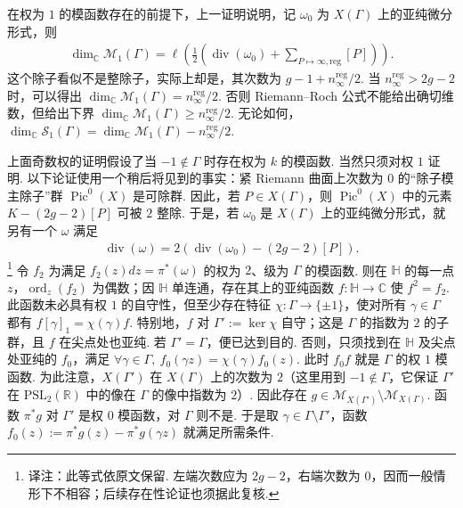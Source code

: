 \begin{remark*}[{$k=1$ 时会怎样？}]
在权为 $1$ 的模函数存在的前提下，上一证明说明，记 $\omega_0$ 为 $X(\Gamma)$ 上的亚纯微分形式，则
\begin{align*}
\dim_{\mathbb C}\mathcal M_1(\Gamma)=\ell\left(\tfrac12\left(\operatorname{div}(\omega_0)+\sum_{P\mapsto\infty,\mathrm{reg}}[P]\right)\right).
\end{align*}
这个除子看似不是整除子，实际上却是，其次数为 $g-1+n_\infty^{\mathrm{reg}}/2$. 当 $n_\infty^{\mathrm{reg}}>2g-2$ 时，可以得出 $\dim_{\mathbb C}\mathcal M_1(\Gamma)=n_\infty^{\mathrm{reg}}/2$. 否则 Riemann--Roch 公式不能给出确切维数，但给出下界 $\dim_{\mathbb C}\mathcal M_1(\Gamma)\geqslant n_\infty^{\mathrm{reg}}/2$. 无论如何，$\dim_{\mathbb C}\mathcal S_1(\Gamma)=\dim_{\mathbb C}\mathcal M_1(\Gamma)-n_\infty^{\mathrm{reg}}/2$.
\end{remark*}
\begin{remark*}[{权为 $1$ 的模函数的存在性}]
上面奇数权的证明假设了当 $-1\notin\Gamma$ 时存在权为 $k$ 的模函数. 当然只须对权 $1$ 证明. 以下论证使用一个稍后将见到的事实：紧 Riemann 曲面上次数为 $0$ 的``除子模主除子''群 $\operatorname{Pic}^0(X)$ 是可除群.
因此，若 $P\in X(\Gamma)$，则 $\operatorname{Pic}^0(X)$ 中的元素 $K-(2g-2)[P]$ 可被 $2$ 整除. 于是，若 $\omega_0$ 是 $X(\Gamma)$ 上的亚纯微分形式，就另有一个 $\omega$ 满足
\begin{align*}
\operatorname{div}(\omega)=2(\operatorname{div}(\omega_0)-(2g-2)[P]).
\end{align*}
\footnote{译注：此等式依原文保留. 左端次数应为 $2g-2$，右端次数为 $0$，因而一般情形下不相容；后续存在性论证也须据此复核.}
令 $f_2$ 为满足 $f_2(z)dz=\pi^*(\omega)$ 的权为 $2$、级为 $\Gamma$ 的模函数. 则在 $\mathbb H$ 的每一点 $z$，$\operatorname{ord}_z(f_2)$ 为偶数；因 $\mathbb H$ 单连通，存在其上的亚纯函数 $f:\mathbb H\to\mathbb C$ 使 $f^2=f_2$. 此函数未必具有权 $1$ 的自守性，但至少存在特征 $\chi:\Gamma\to\{\pm1\}$，使对所有 $\gamma\in\Gamma$ 都有 $f[\gamma]_1=\chi(\gamma)f$. 特别地，$f$ 对 $\Gamma':=\ker\chi$ 自守；这是 $\Gamma$ 的指数为 $2$ 的子群，且 $f$ 在尖点处也亚纯.
若 $\Gamma'=\Gamma$，便已达到目的. 否则，只须找到在 $\mathbb H$ 及尖点处亚纯的 $f_0$，满足 $\forall\gamma\in\Gamma,\ f_0(\gamma z)=\chi(\gamma)f_0(z)$. 此时 $f_0f$ 就是 $\Gamma$ 的权 $1$ 模函数. 为此注意，$X(\Gamma')$ 在 $X(\Gamma)$ 上的次数为 $2$（这里用到 $-1\notin\Gamma$，它保证 $\Gamma'$ 在 $\mathrm{PSL}_2(\mathbb R)$ 中的像在 $\Gamma$ 的像中指数为 $2$）. 因此存在 $g\in\mathcal M_{X(\Gamma')}\setminus\mathcal M_{X(\Gamma)}$. 函数 $\pi^*g$ 对 $\Gamma'$ 是权 $0$ 模函数，对 $\Gamma$ 则不是. 于是取 $\gamma\in\Gamma\setminus\Gamma'$，函数 $f_0(z):=\pi^*g(z)-\pi^*g(\gamma z)$ 就满足所需条件.
\end{remark*}
